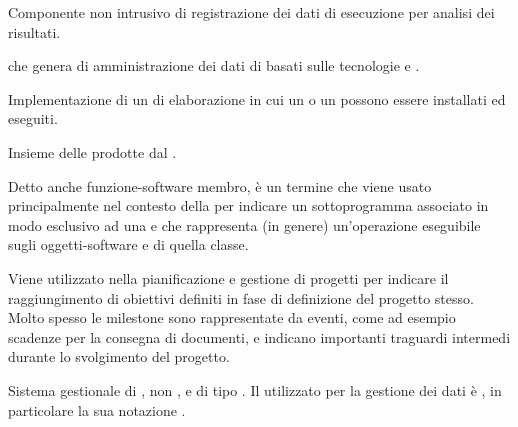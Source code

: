 {Componente non intrusivo di registrazione dei dati di esecuzione per analisi dei risultati.}




{ che genera   di amministrazione dei dati di  basati sulle tecnologie e .}

{Implementazione  di un  di elaborazione in cui un  o un  possono essere installati ed eseguiti.}

{Insieme delle  prodotte dal  .}

{Detto anche funzione-software membro, è un termine che viene usato principalmente nel contesto della   per indicare un sottoprogramma associato in modo esclusivo ad una  e che rappresenta (in genere) un'operazione eseguibile sugli oggetti-software e  di quella classe.}

{Viene utilizzato nella pianificazione e gestione di progetti per indicare il raggiungimento di obiettivi definiti in fase di definizione del progetto stesso. Molto spesso le milestone sono rappresentate da eventi, come ad esempio scadenze per la consegna di documenti, e indicano importanti traguardi intermedi durante lo svolgimento del progetto.}

{Sistema gestionale di , non ,  e di tipo . Il  utilizzato per la gestione dei dati è , in particolare la sua notazione .}